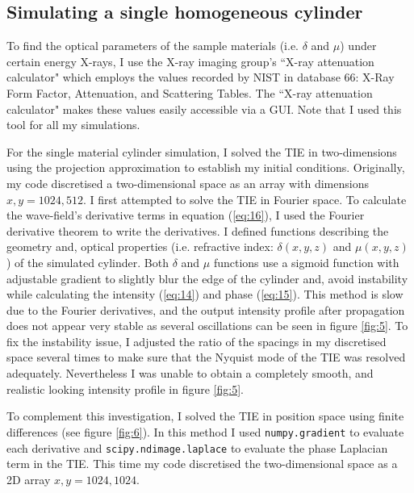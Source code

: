 \documentclass[10pt, a4paper, singlespacing]{report}
\begin{document}
\subsection{Simulating a single homogeneous cylinder}\label{Single cylinder}
To find the optical parameters of the sample materials (i.e. $\delta$ and $\mu$) under certain energy X-rays, I use the X-ray imaging group's ``X-ray attenuation calculator" which employs the values recorded by NIST in database 66: X-Ray Form Factor, Attenuation, and Scattering Tables\cite{NIST}. The ``X-ray attenuation calculator" makes these values easily accessible via a GUI. Note that I used this tool for all my simulations.

For the single material cylinder simulation, I solved the TIE in two-dimensions using the projection approximation to establish my initial conditions.  Originally, my code discretised a two-dimensional space as an array with dimensions $x, y = 1024, 512$. I first attempted to solve the TIE in Fourier space. To calculate the wave-field's derivative terms in equation (\ref{eq:16}), I used the Fourier derivative theorem to write the derivatives. I defined functions describing the geometry and, optical properties (i.e. refractive index: $\delta(x, y, z)$ and $\mu(x, y, z)$) of the simulated cylinder. Both $\delta$ and $\mu$ functions use a sigmoid function with adjustable gradient to slightly blur the edge of the cylinder and, avoid instability while calculating the intensity (\ref{eq:14}) and phase (\ref{eq:15}). This method is slow due to the Fourier derivatives, and the output intensity profile after propagation does not appear very stable as several oscillations can be seen in figure \ref{fig:5}. To fix the instability issue, I adjusted the ratio of the spacings in my discretised space several times to make sure that the Nyquist mode of the TIE was resolved adequately. Nevertheless I was unable to obtain a completely smooth, and realistic looking intensity profile in figure \ref{fig:5}.

To complement this investigation, I solved the TIE in position space using finite differences (see figure \ref{fig:6}). In this method I used \texttt{numpy.gradient} to evaluate each derivative and \texttt{scipy.ndimage.laplace} to evaluate the phase Laplacian term in the TIE. This time my code discretised the two-dimensional space as a 2D array $x, y = 1024, 1024$. 
\end{document}
